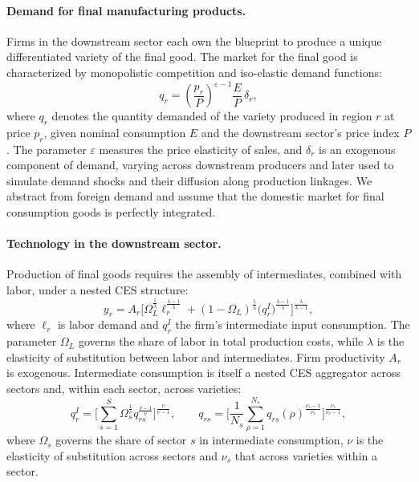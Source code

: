 \paragraph{Demand for final manufacturing products.} Firms in the downstream sector each own the
blueprint to produce a unique differentiated variety of the final good. The market for the final
good is characterized by monopolistic competition and iso-elastic demand functions:
\begin{equation}
q_{r}=\left(\frac{p_{r}}{P}\right)^{\varepsilon-1}\frac{E}{P}\,\delta_{r},
\end{equation}
where $q_{r}$ denotes the quantity demanded of the variety produced in region $r$ at price
$p_{r}$, given nominal consumption $E$ and the downstream sector's price index $P$. The
parameter $\varepsilon$ measures the price elasticity of sales, and $\delta_{r}$ is an exogenous
component of demand, varying across downstream producers and later used to simulate demand
shocks and their diffusion along production linkages. We abstract from foreign demand and assume
that the domestic market for final consumption goods is perfectly integrated.

\paragraph{Technology in the downstream sector.} Production of final goods requires the assembly
of intermediates, combined with labor, under a nested CES structure:
\begin{equation}
y_{r}=A_{r}\Big[\Omega_{L}^{\frac{1}{\lambda}}\ell_{r}^{\frac{\lambda-1}{\lambda}}
+(1-\Omega_{L})^{\frac{1}{\lambda}}\big(q^{I}_{r}\big)^{\frac{\lambda-1}{\lambda}}\Big]^{\frac{\lambda}{\lambda-1}},
\end{equation}
where $\ell_{r}$ is labor demand and $q^{I}_{r}$ the firm's intermediate input consumption. The
parameter $\Omega_{L}$ governs the share of labor in total production costs, while $\lambda$ is
the elasticity of substitution between labor and intermediates. Firm productivity $A_{r}$ is
exogenous. Intermediate consumption is itself a nested CES aggregator across sectors and, within
each sector, across varieties:
\begin{equation}
q^{I}_{r}=\Big[\sum_{s=1}^{S}\Omega_{s}^{\frac{1}{\nu}}q_{rs}^{\frac{\nu-1}{\nu}}\Big]^{\frac{\nu}{\nu-1}},
\qquad
q_{rs}=\Big[\frac{1}{N_{s}}\sum_{\rho=1}^{N_{s}}q_{rs}(\rho)^{\frac{\nu_{s}-1}{\nu_{s}}}\Big]^{\frac{\nu_{s}}{\nu_{s}-1}},
\label{eq:app-ces}
\end{equation}
where $\Omega_{s}$ governs the share of sector $s$ in intermediate consumption, $\nu$ is the
elasticity of substitution across sectors and $\nu_{s}$ that across varieties within a sector.

